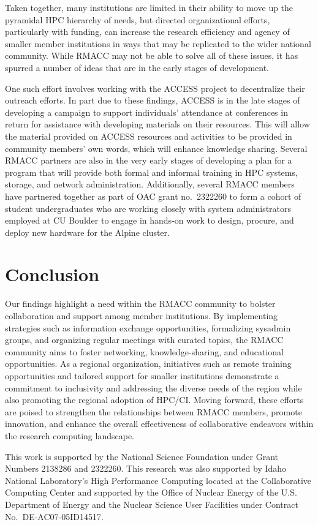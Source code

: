 \documentclass[sigconf]{acmart}
\theoremstyle{plain}
\begin{document}
Taken together, many institutions are limited in their ability to move
up the pyramidal HPC hierarchy of needs, but directed organizational
efforts, particularly with funding, can increase the research
efficiency and agency of smaller member institutions in ways that may
be replicated to the wider national community.  While RMACC may not be
able to solve all of these issues, it has spurred a number of ideas
that are in the early stages of development.  

One such effort involves working with the ACCESS project to
decentralize their outreach efforts.  In part due to these findings,
ACCESS is in the late stages of developing a campaign to support
individuals' attendance at conferences in return for assistance with
developing materials on their resources.  This will allow the material
provided on ACCESS resources and activities to be provided in
community members' own words, which will enhance knowledge sharing.
Several RMACC partners are also in the very early stages of developing
a plan for a program that will provide both formal and informal
training in HPC systems, storage, and network administration.
Additionally, several RMACC members have partnered together as part of
OAC grant no.\ 2322260 to form a cohort of student undergraduates who
are working closely with system administrators employed at CU Boulder
to engage in hands-on work to design, procure, and deploy new hardware
for the Alpine cluster.

\section{Conclusion}

Our findings highlight a need within the RMACC community to bolster
collaboration and support among member institutions. By implementing
strategies such as information exchange opportunities, formalizing
sysadmin groups, and organizing regular meetings with curated topics,
the RMACC community aims to foster networking, knowledge-sharing, and
educational opportunities. As a regional organization, initiatives such
as remote training opportunities and tailored support for smaller
institutions demonstrate a commitment to inclusivity and addressing the
diverse needs of the region while also promoting the regional adoption
of HPC/CI. Moving forward, these efforts are poised to strengthen the
relationships between RMACC members, promote innovation, and enhance the
overall effectiveness of collaborative endeavors within the research
computing landscape. 

\begin{acks}
This work is supported by the National Science Foundation under Grant
Numbers 2138286 and 2322260. This research was also supported by Idaho National
Laboratory's High Performance Computing located at the
Collaborative Computing Center and supported by the Office of Nuclear
Energy of the U.S. Department of Energy and the Nuclear Science User
Facilities under Contract No.\ DE-AC07-05ID14517.  
\end{acks}


%


\end{document}

